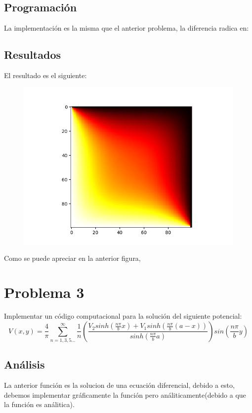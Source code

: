 \documentclass[a4paper,12pt]{article}
\begin{document}
    \subsection{Programación}
    La implementación es la misma que el anterior problema, la diferencia radica en:

    
    \subsection{Resultados}
    El resultado es el siguiente:
    \begin{figure}[h]
        \centering
        \includegraphics[scale=0.5]{ejer2_demostr.png}
    \end{figure}

    Como se puede apreciar en la anterior figura, %

    \section{Problema 3}
    Implementar un código computacional para la solución del siguiente
    potencial:
    \begin{equation}
        V(x,y) = \frac{4}{\pi} \sum_{n=1,3,5\dots} ^{\infty} \frac{1}{n} (\frac{V_2 sinh(\frac{n\pi}{b} x) + V_1 sinh(\frac{n\pi}{b}(a-x))}{sinh(\frac{n\pi}{b}a)})sin(\frac{n\pi}{b}y)
    \end{equation}    
    \subsection{Análisis}
    La anterior función es la solucion de una ecuación diferencial, debido a esto, debemos implementar
    gráficamente la función pero análiticamente(debido a que la función es análitica).
\end{document}
